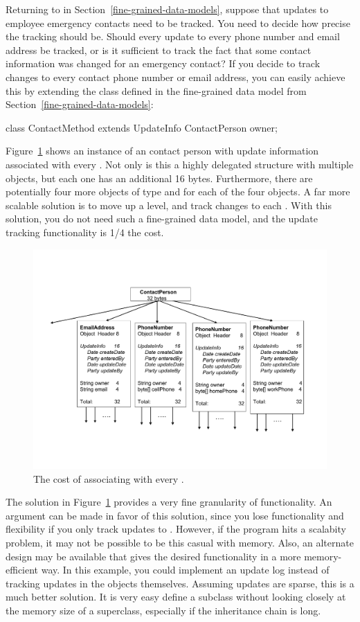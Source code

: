 Returning to  in Section~\ref{fine-grained-data-models}, suppose that
updates to employee emergency contacts need to be tracked. You need to decide
how precise the tracking should be. Should every update to every phone number
and email address be tracked, or is it sufficient to track the fact that some
contact information was changed for an emergency contact? If you decide to
track changes to every contact phone number or email address, you can easily achieve this by extending the  class defined in the fine-grained data model from Section~\ref{fine-grained-data-models}:
\begin{shortlisting}
class ContactMethod extends UpdateInfo {
     ContactPerson owner;
}
\end{shortlisting}
Figure~\ref{fig:big-base-class} shows an instance of an contact person with
update information associated with every . Not only is this
a highly delegated structure with multiple  objects, but
each one has an additional 16 bytes. Furthermore, there are potentially four
more objects of type  and  for each of the four
 objects. A far more scalable solution is to move up a
level, and track changes to each . With this solution, you
do not need such a fine-grained data model, and the update tracking functionality is 1/4 the cost.
\begin{figure}
  \centering
 \includegraphics[width=.70\textwidth]{part1/Figures/modelingdatatypes/big-base-class.pdf}
  \caption{The cost of associating  with every
  .}
  \label{fig:big-base-class}
\end{figure}
 
The solution in Figure~\ref{fig:big-base-class} provides a very fine
granularity of functionality. An argument can be made in favor of this
solution, since you lose functionality and flexibility if you only track
updates to . However, if the program hits a scalabity
problem, it may not be possible to be this casual with memory. Also, an alternate design may be available that gives the desired functionality in a more memory-efficient way. In this example, you could implement an update log instead of tracking updates in the objects themselves. Assuming updates are sparse, this is a much better solution. It is very easy define a subclass without looking closely at the memory size of a superclass, especially if the inheritance chain is long.

